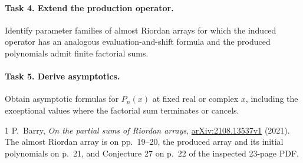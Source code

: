 \documentclass[10pt]{article}
\begin{document}
\paragraph{Task 4. Extend the production operator.}
Identify parameter families of almost Riordan arrays for which
the induced operator has an analogous evaluation-and-shift
formula and the produced polynomials admit finite factorial sums.

\paragraph{Task 5. Derive asymptotics.}
Obtain asymptotic formulas for \(P_n(x)\) at fixed real or complex
\(x\), including the exceptional values where the factorial sum
terminates or cancels.

\begin{thebibliography}{1}
 P.~Barry, \emph{On the partial sums of Riordan
arrays}, \href{https://arxiv.org/abs/2108.13537}
{arXiv:2108.13537v1} (2021). The almost Riordan array is on
pp.~19--20, the produced array and its initial polynomials on
p.~21, and Conjecture 27 on p.~22 of the inspected 23-page PDF.
\end{thebibliography}
\end{document}
